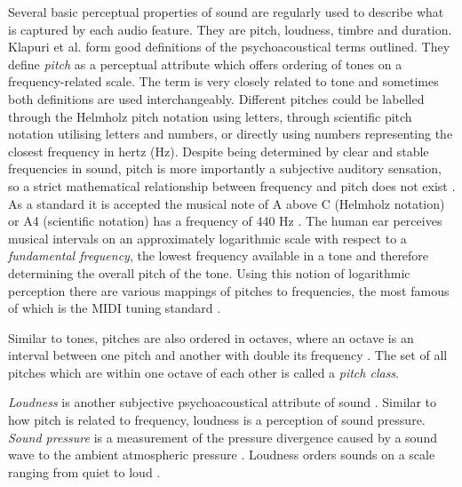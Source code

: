 Several basic perceptual properties of sound are regularly used to describe what
is captured by each audio feature. They are pitch, loudness, timbre and
duration. Klapuri et al. \cite{klapuri2007signal} form good definitions of the
psychoacoustical terms outlined. They define \textit{pitch} as a perceptual
attribute which offers ordering of tones on a frequency-related scale. The term
is very closely related to tone and sometimes both definitions are used
interchangeably. Different pitches could be labelled through the Helmholz pitch
notation \cite{helmholtz2013sensations} using letters, through scientific pitch
notation \cite{fletcher1934loudness} utilising letters and numbers, or directly
using numbers representing the closest frequency in hertz (Hz). Despite being
determined by clear and stable frequencies in sound, pitch is more importantly a
subjective auditory sensation, so a strict mathematical relationship between
frequency and pitch does not exist \cite{acoustical1986american}. As a standard
it is accepted the musical note of A above C (Helmholz notation) or A4
(scientific notation) has a frequency of 440 Hz \cite{young1939terminology}. The
human ear perceives musical intervals on an approximately logarithmic scale with
respect to a \textit{fundamental frequency}, the lowest frequency available in a
tone and therefore determining the overall pitch of the tone. Using this notion
of logarithmic perception there are various mappings of pitches to frequencies,
the most famous of which is the MIDI tuning standard \cite{mts}.

Similar to tones, pitches are also ordered in octaves, where an octave is an
interval between one pitch and another with double its frequency
\cite{wiki:octave}. The set of all pitches which are within one octave of each
other is called a \textit{pitch class}.

\textit{Loudness} is another subjective psychoacoustical attribute of sound
\cite{klapuri2007signal}. Similar to how pitch is related to frequency, loudness
is a perception of sound pressure. \textit{Sound pressure} is a measurement of
the pressure divergence caused by a sound wave to the ambient atmospheric
pressure \cite{sound-pressure}. Loudness orders sounds on a scale ranging from
quiet to loud \cite{acoustical1986american}.


